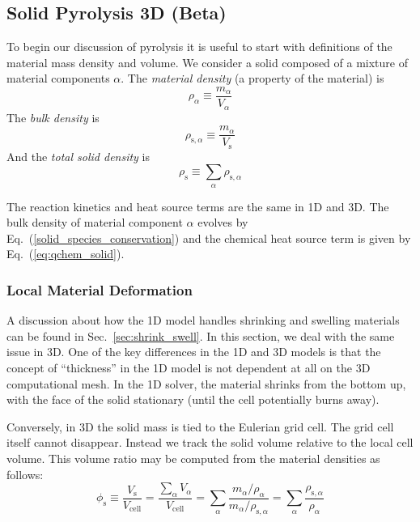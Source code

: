 {\subsection{Solid Pyrolysis 3D (Beta)}

To begin our discussion of pyrolysis it is useful to start with definitions of the material mass density and volume.  We consider a solid composed of a mixture of material components $\alpha$.  The \emph{material density} (a property of the material) is
\begin{equation}
\label{eq:matden}
\rho_\alpha \equiv \frac{m_\alpha}{V_\alpha}
\end{equation}
The \emph{bulk density} is
\begin{equation}
\label{eq:bulkden}
\rho_{\mathrm{s},\alpha} \equiv \frac{m_\alpha}{V_{\mathrm{s}}}
\end{equation}
And the \emph{total solid density} is
\begin{equation}
\label{eq:totalsolidden}
\rho_{\mathrm{s}} \equiv \sum_\alpha \rho_{\mathrm{s},\alpha}
\end{equation}

The reaction kinetics and heat source terms are the same in 1D and 3D.  The bulk density of material component $\alpha$ evolves by Eq.~(\ref{solid_species_conservation}) and the chemical heat source term is given by Eq.~(\ref{eq:qchem_solid}).

\subsubsection*{Local Material Deformation}
\label{sec:locmatdef}

A discussion about how the 1D model handles shrinking and swelling materials can be found in Sec.~\ref{sec:shrink_swell}.  In this section, we deal with the same issue in 3D.  One of the key differences in the 1D and 3D models is that the concept of ``thickness'' in the 1D model is not dependent at all on the 3D computational mesh.  In the 1D solver, the material shrinks from the bottom up, with the face of the solid stationary (until the cell potentially burns away).

Conversely, in 3D the solid mass is tied to the Eulerian grid cell.  The grid cell itself cannot disappear.  Instead we track the solid volume relative to the local cell volume.  This volume ratio may be computed from the material densities as follows:
\begin{equation}
\label{eq:volratio}
\phi_{\mathrm{s}} \equiv \frac{V_{\mathrm{s}}}{V_{\mathrm{cell}}} = \frac{\sum_\alpha V_\alpha}{V_{\mathrm{cell}}} = \sum_\alpha \frac{m_\alpha/\rho_\alpha}{m_\alpha/\rho_{\mathrm{s},\alpha}} = \sum_\alpha \frac{\rho_{\mathrm{s},\alpha}}{\rho_\alpha}
\end{equation}

}
